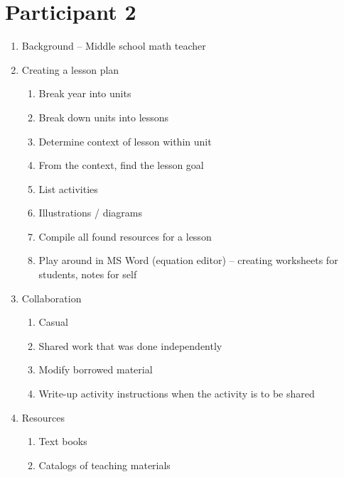 \documentclass[11pt,letter]{article}
\begin{document}
\section*{Participant 2}
\begin{enumerate}
	\item Background -- Middle school math teacher

	\item Creating a lesson plan
		\begin{enumerate}
			\item Break year into units

			\item Break down units into lessons

			\item Determine context of lesson within unit

			\item From the context, find the lesson goal

			\item List activities

			\item Illustrations / diagrams

			\item Compile all found resources for a lesson

			\item Play around in MS Word (equation editor) -- creating
				worksheets for students, notes for self

		\end{enumerate}

	\item Collaboration
		\begin{enumerate}
			\item Casual

			\item Shared work that was done independently

			\item Modify borrowed material

			\item Write-up activity instructions when the activity is to be
				shared

		\end{enumerate}

	\item Resources
		\begin{enumerate}
			\item Text books

			\item Catalogs of teaching materials


\end{enumerate}
\end{enumerate}
\end{document}
